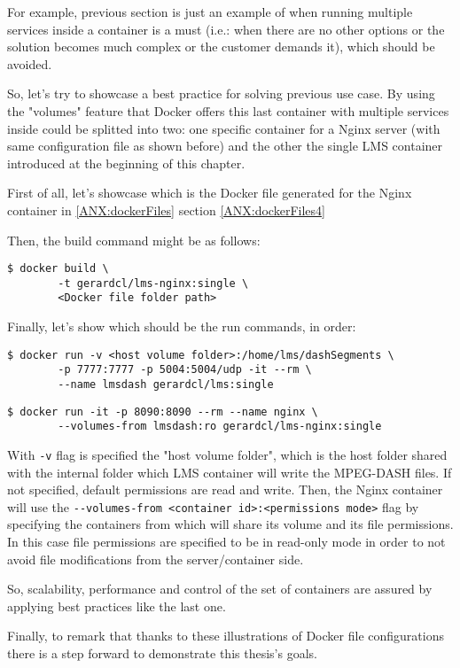 For example, previous section is just an example of when running multiple services inside a container is a must (i.e.: when there are no other options or the solution becomes much complex or the customer demands it), which should be avoided.

So, let's try to showcase a best practice for solving previous use case. By using the "volumes" feature that Docker offers this last container with multiple services inside could be splitted into two: one specific container for a Nginx server (with same configuration file as shown before) and the other the single LMS container introduced at the beginning of this chapter. 

First of all, let's showcase which is the Docker file generated for the Nginx container in
\ref{ANX:dockerFiles} section \ref{ANX:dockerFiles4}

Then, the build command might be as follows:

\begin{verbatim}
$ docker build \
		-t gerardcl/lms-nginx:single \
		<Docker file folder path>
\end{verbatim}

Finally, let's show which should be the run commands, in order:

\begin{verbatim}
$ docker run -v <host volume folder>:/home/lms/dashSegments \
		-p 7777:7777 -p 5004:5004/udp -it --rm \
		--name lmsdash gerardcl/lms:single
\end{verbatim}

\begin{verbatim}
$ docker run -it -p 8090:8090 --rm --name nginx \
		--volumes-from lmsdash:ro gerardcl/lms-nginx:single 
\end{verbatim}

With \verb|-v| flag is specified the "host volume folder", which is the host folder shared with the internal folder which LMS container will write the MPEG-DASH files. If not specified, default permissions are read and write. Then, the Nginx container will use the \verb|--volumes-from <container id>:<permissions mode>| flag by specifying the containers from which will share its volume and its file permissions. In this case file permissions are specified to be in read-only mode in order to not avoid file modifications from the server/container side.  
 
So, scalability, performance and control of the set of containers are assured by applying best practices like the last one.

Finally, to remark that thanks to these illustrations of Docker file configurations there is a step forward to demonstrate this thesis's goals.
